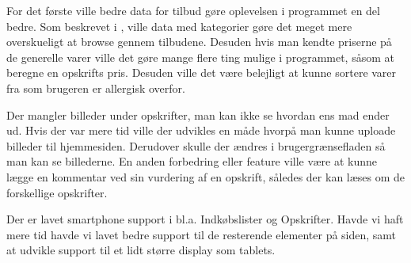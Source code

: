 For det første ville bedre data for tilbud gøre oplevelsen i programmet en del bedre.
Som beskrevet i , ville data med kategorier gøre det meget mere overskueligt at browse gennem tilbudene. 
Desuden hvis man kendte priserne på de generelle varer ville det gøre mange flere ting mulige i programmet, såsom at beregne en opskrifts pris. 
Desuden ville det være belejligt at kunne sortere varer fra som brugeren er allergisk overfor.

Der mangler billeder under opskrifter, man kan ikke se hvordan ens mad ender ud.
Hvis der var mere tid ville der udvikles en måde hvorpå man kunne uploade billeder til hjemmesiden. 
Derudover skulle der ændres i brugergrænsefladen så man kan se billederne.
En anden forbedring eller feature ville være at kunne lægge en kommentar ved sin vurdering af en opskrift, således der kan læses om de forskellige opskrifter. 

Der er lavet smartphone support i bl.a. Indkøbslister og Opskrifter.
Havde vi haft mere tid havde vi lavet bedre support til de resterende elementer på siden, samt at udvikle support til et lidt større display som tablets.
